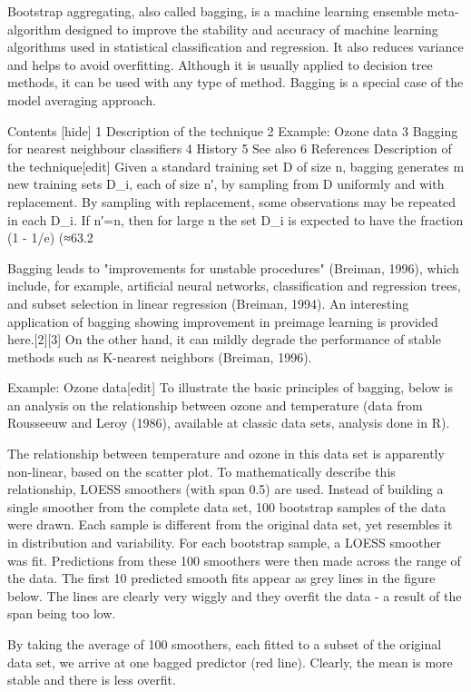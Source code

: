 Bootstrap aggregating, also called bagging, is a machine learning ensemble meta-algorithm designed to improve the stability and accuracy of machine learning algorithms used in statistical classification and regression. It also reduces variance and helps to avoid overfitting. Although it is usually applied to decision tree methods, it can be used with any type of method. Bagging is a special case of the model averaging approach.

Contents  [hide] 
1	Description of the technique
2	Example: Ozone data
3	Bagging for nearest neighbour classifiers
4	History
5	See also
6	References
Description of the technique[edit]
Given a standard training set D of size n, bagging generates m new training sets D_i, each of size n′, by sampling from D uniformly and with replacement. By sampling with replacement, some observations may be repeated in each D_i. If n′=n, then for large n the set D_i is expected to have the fraction (1 - 1/e) (≈63.2%

Bagging leads to "improvements for unstable procedures" (Breiman, 1996), which include, for example, artificial neural networks, classification and regression trees, and subset selection in linear regression (Breiman, 1994). An interesting application of bagging showing improvement in preimage learning is provided here.[2][3] On the other hand, it can mildly degrade the performance of stable methods such as K-nearest neighbors (Breiman, 1996).

Example: Ozone data[edit]
To illustrate the basic principles of bagging, below is an analysis on the relationship between ozone and temperature (data from Rousseeuw and Leroy (1986), available at classic data sets, analysis done in R).

The relationship between temperature and ozone in this data set is apparently non-linear, based on the scatter plot. To mathematically describe this relationship, LOESS smoothers (with span 0.5) are used. Instead of building a single smoother from the complete data set, 100 bootstrap samples of the data were drawn. Each sample is different from the original data set, yet resembles it in distribution and variability. For each bootstrap sample, a LOESS smoother was fit. Predictions from these 100 smoothers were then made across the range of the data. The first 10 predicted smooth fits appear as grey lines in the figure below. The lines are clearly very wiggly and they overfit the data - a result of the span being too low.

By taking the average of 100 smoothers, each fitted to a subset of the original data set, we arrive at one bagged predictor (red line). Clearly, the mean is more stable and there is less overfit.
